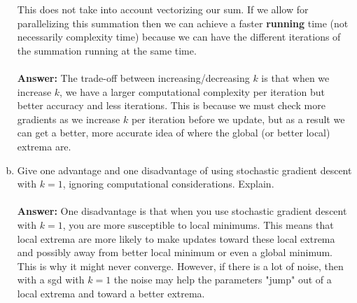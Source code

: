 \documentclass[11pt]{article}
\begin{document}
\begin{enumerate}[(a)]
This does not take into account vectorizing our sum. If we allow for parallelizing this summation then we can achieve a faster {\bf running} time (not necessarily complexity time) because we can have the different iterations of the summation running at the same time. 
\\ \\
{\bf Answer: } The trade-off between increasing/decreasing $k$ is that when we increase $k$, we have a larger computational complexity per iteration but better accuracy and less iterations. This is because we must check more gradients as we increase $k$ per iteration before we update, but as a result we can get a better, more accurate idea of where the global (or better local) extrema are.








\item Give one advantage and one disadvantage of using stochastic gradient
descent with $k=1$, ignoring computational considerations.  Explain.
\\ \\
{\bf Answer: } One disadvantage is that when you use stochastic gradient descent with $k=1$, you are more susceptible to local minimums. This means that local extrema are more likely to make updates toward these local extrema and possibly away from better local minimum or even a global minimum. This is why it might never converge. However, if there is a lot of noise, then with a sgd with $k=1$ the noise may help the parameters "jump" out of a local extrema and toward a better extrema.

\end{enumerate}
\end{document}
